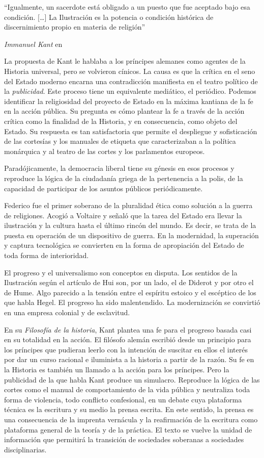 \epigraph{\enquote{Igualmente, un sacerdote está obligado a un puesto que fue aceptado bajo esa condición. [\ldots] La Ilustración es la potencia o condición histórica de discernimiento propio en materia de religión}}{\emph{Immanuel Kant} en~\autocite[p.~96]{kantQueEsIlustracion2009}}

La propuesta de Kant le hablaba a los príncipes alemanes como agentes de la Historia universal, pero se volvieron cínicos. La causa es que la crítica en el seno del Estado moderno encarna una contradicción manifiesta en el teatro político de la \emph{publicidad}. Este proceso tiene un equivalente mediático, el periódico. Podemos identificar la religiosidad del proyecto de Estado en la máxima kantiana de la fe en la acción pública. Su pregunta es cómo plantear la fe a través de la acción crítica como la finalidad de la Historia, y en consecuencia, como objeto del Estado. Su respuesta es tan satisfactoria que permite el despliegue y sofisticación de las cortesías y los manuales de etiqueta que caracterizaban a la política monárquica y al teatro de las cortes y los parlamentos europeos.

Paradójicamente, la democracia liberal tiene su génesis en esos procesos y reproduce la lógica de la ciudadanía griega de la pertenencia a la polis, de la capacidad de participar de los asuntos públicos periódicamente.

Federico fue el primer soberano de la pluralidad ética como solución a la guerra de religiones. Acogió a Voltaire y señaló que la tarea del Estado era llevar la ilustración y la cultura hasta el último rincón del mundo. Es decir, se trata de la puesta en operación de un dispositivo de guerra. En la modernidad, la superación y captura tecnológica se convierten en la forma de apropiación del Estado de toda forma de interioridad.

El progreso y el universalismo son conceptos en disputa. Los sentidos de la Ilustración según el artículo de Hui son, por un lado, el de Diderot y por otro el de Hume. Algo parecido a la tensión entre el espíritu estoico y el escéptico de los que habla Hegel. El progreso ha sido malentendido. La modernización se convirtió en una empresa colonial y de esclavitud.

En su \emph{Filosofía de la historia}, Kant plantea una fe para el progreso basada casi en su totalidad en la acción. El filósofo alemán escribió desde un principio para los príncipes que pudieran leerlo con la intención de suscitar en ellos el interés por dar un curso racional e iluminista a la historia a partir de la razón. Su fe en la Historia es también un llamado a la acción para los príncipes. Pero la publicidad de la que habla Kant produce un simulacro. Reproduce la lógica de las cortes como el manual de comportamiento de la vida pública y neutraliza toda forma de violencia, todo conflicto confesional, en un debate cuya plataforma técnica es la escritura y su medio la prensa escrita. En este sentido, la prensa es una consecuencia de la imprenta vernácula y la reafirmación de la escritura como plataforma general de la teoría y de la práctica. El texto se vuelve la unidad de información que permitirá la transición de sociedades soberanas a sociedades disciplinarias.


